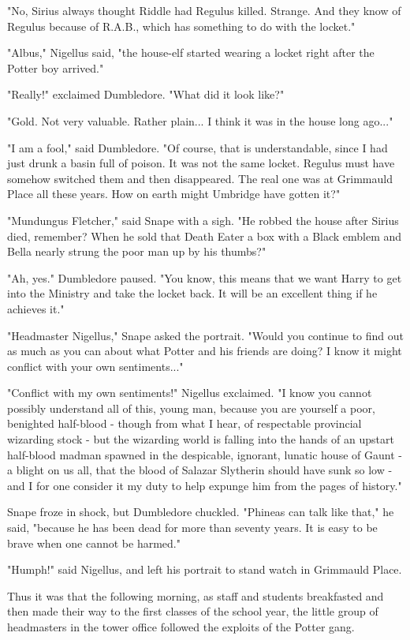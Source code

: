 \documentclass[a4paper,11pt]{article}
\begin{document}
"No, Sirius always thought Riddle had Regulus killed. Strange. And they know of Regulus because of R.A.B., which has something to do with the locket."

"Albus," Nigellus said, "the house-elf started wearing a locket right after the Potter boy arrived."

"Really!" exclaimed Dumbledore. "What did it look like?"

"Gold. Not very valuable. Rather plain... I think it was in the house long ago..."

"I am a fool," said Dumbledore. "Of course, that is understandable, since I had just drunk a basin full of poison. It was not the same locket. Regulus must have somehow switched them and then disappeared. The real one was at Grimmauld Place all these years. How on earth might Umbridge have gotten it?"

"Mundungus Fletcher," said Snape with a sigh. "He robbed the house after Sirius died, remember? When he sold that Death Eater a box with a Black emblem and Bella nearly strung the poor man up by his thumbs?"

"Ah, yes." Dumbledore paused. "You know, this means that we want Harry to get into the Ministry and take the locket back. It will be an excellent thing if he achieves it."

"Headmaster Nigellus," Snape asked the portrait. "Would you continue to find out as much as you can about what Potter and his friends are doing? I know it might conflict with your own sentiments..."

"Conflict with my own sentiments!" Nigellus exclaimed. "I know you cannot possibly understand all of this, young man, because you are yourself a poor, benighted half-blood - though from what I hear, of respectable provincial wizarding stock - but the wizarding world is falling into the hands of an upstart half-blood madman spawned in the despicable, ignorant, lunatic house of Gaunt - a blight on us all, that the blood of Salazar Slytherin should have sunk so low - and I for one consider it my duty to help expunge him from the pages of history."

Snape froze in shock, but Dumbledore chuckled. "Phineas can talk like that," he said, "because he has been dead for more than seventy years. It is easy to be brave when one cannot be harmed."

"Humph!" said Nigellus, and left his portrait to stand watch in Grimmauld Place.

Thus it was that the following morning, as staff and students breakfasted and then made their way to the first classes of the school year, the little group of headmasters in the tower office followed the exploits of the Potter gang.
\end{document}
